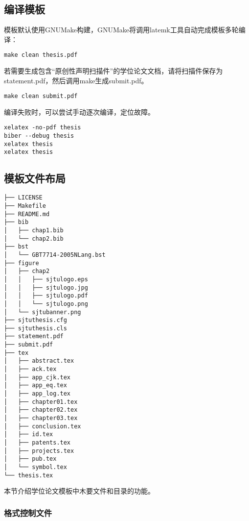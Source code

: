\subsection{编译模板}
\label{sec:process}

模板默认使用GNUMake构建，GNUMake将调用latemk工具自动完成模板多轮编译：

\begin{lstlisting}[basicstyle=\small\ttfamily, caption={编译模板}, numbers=none]
make clean thesis.pdf
\end{lstlisting}

若需要生成包含“原创性声明扫描件”的学位论文文档，请将扫描件保存为statement.pdf，然后调用make生成submit.pdf。

\begin{lstlisting}[basicstyle=\small\ttfamily, caption={生成用于提交的学位论文}, numbers=none]
make clean submit.pdf
\end{lstlisting}

编译失败时，可以尝试手动逐次编译，定位故障。

\begin{lstlisting}[basicstyle=\small\ttfamily, caption={手动逐次编译}, numbers=none]
xelatex -no-pdf thesis
biber --debug thesis
xelatex thesis
xelatex thesis
\end{lstlisting}

\subsection{模板文件布局}
\label{sec:layout}

\begin{lstlisting}[basicstyle=\small\ttfamily,caption={模板文件布局},label=layout,float,numbers=none]
├── LICENSE
├── Makefile
├── README.md
├── bib
│   ├── chap1.bib
│   └── chap2.bib
├── bst
│   └── GBT7714-2005NLang.bst
├── figure
│   ├── chap2
│   │   ├── sjtulogo.eps
│   │   ├── sjtulogo.jpg
│   │   ├── sjtulogo.pdf
│   │   └── sjtulogo.png
│   └── sjtubanner.png
├── sjtuthesis.cfg
├── sjtuthesis.cls
├── statement.pdf
├── submit.pdf
├── tex
│   ├── abstract.tex
│   ├── ack.tex
│   ├── app_cjk.tex
│   ├── app_eq.tex
│   ├── app_log.tex
│   ├── chapter01.tex
│   ├── chapter02.tex
│   ├── chapter03.tex
│   ├── conclusion.tex
│   ├── id.tex
│   ├── patents.tex
│   ├── projects.tex
│   ├── pub.tex
│   └── symbol.tex
└── thesis.tex
\end{lstlisting}

本节介绍学位论文模板中木要文件和目录的功能。

\subsubsection{格式控制文件}
\label{sec:format}

